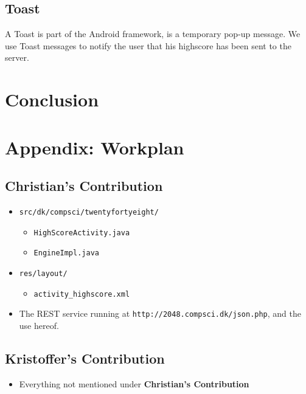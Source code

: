 \documentclass[a4paper, 12pt]{article}
\newcommand{\code}[1]{\texttt{#1}}
\begin{document}

\subsection{Toast}
A Toast is part of the Android framework, is a temporary pop-up
message. We use Toast messages to notify the user that his highscore
has been sent to the server.


\section{Conclusion}

\newpage
\appendix
\section{Appendix: Workplan}
\subsection{Christian's Contribution}
\begin{itemize}
\item \code{src/dk/compsci/twentyfortyeight/}
  \begin{itemize}
  \item \code{HighScoreActivity.java}
  \item \code{EngineImpl.java}
  \end{itemize}
\item \code{res/layout/}
  \begin{itemize}
  \item \code{activity\_highscore.xml}
  \end{itemize}
\item The REST service running at \code{http://2048.compsci.dk/json.php}, and the use hereof.
\end{itemize}
\subsection{Kristoffer's Contribution}
\begin{itemize}
\item Everything not mentioned under \textbf{Christian's Contribution}
\end{itemize}
\end{document}
